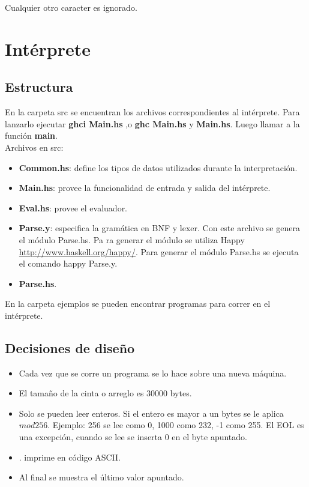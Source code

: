 \documentclass[a4paper, 12pt]{article}
\begin{document}
Cualquier otro caracter es ignorado.
\section*{Intérprete}

\subsection*{Estructura}
En la carpeta src se encuentran los archivos correspondientes al intérprete. Para lanzarlo
ejecutar \textbf{ghci Main.hs} ,o \textbf{ghc Main.hs} y \textbf{Main.hs}. Luego llamar a la función \textbf{main}. \\
Archivos en src:
\begin{itemize}
	\item \textbf{Common.hs}: define los tipos de datos utilizados durante la interpretación.
	\item \textbf{Main.hs}: provee la funcionalidad de entrada y salida del intérprete.
	\item \textbf{Eval.hs}: provee el evaluador.
	\item \textbf{Parse.y}: especifica la gramática en BNF y lexer. Con este archivo se genera el módulo Parse.hs. Pa
	ra generar el módulo se utiliza Happy \url{http://www.haskell.org/happy/}. Para generar el módulo Parse.hs
	se ejecuta el comando happy Parse.y.
	\item \textbf{Parse.hs}.
\end{itemize}
En la carpeta ejemplos se pueden encontrar programas para correr en el intérprete. \\


\subsection*{Decisiones de diseño}
\begin{itemize}
	\item Cada vez que se corre un programa se lo hace sobre una nueva máquina.
	\item El tamaño de la cinta o arreglo es 30000 bytes.
	\item Solo se pueden leer enteros. Si el entero es mayor a un bytes se le aplica $mod 256$. Ejemplo: 256
	se lee como 0, 1000 como 232, -1 como 255. El EOL es una excepción, cuando se lee se inserta 0 en el byte apuntado.
	\item . imprime en código ASCII.
	\item Al final se muestra el último valor apuntado.
\end{itemize}
\end{document}
